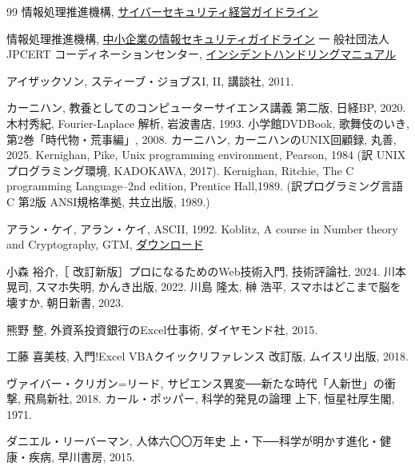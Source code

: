 \documentclass[book, paper=a4paper, 11pt]{jlreq}
\theoremstyle{definition}
\theoremstyle{remark}
\begin{document}
\begin{thebibliography}{99}
       情報処理推進機構, 
      \href{https://www.meti.go.jp/policy/netsecurity/downloadfiles/guide_v3.0.pdf}{サイバーセキュリティ経営ガイドライン}

       情報処理推進機構, 
     \href{https://www.ipa.go.jp/security/guide/sme/ug65p90000019cbk-att/sme_guideline_v4.0.pdf}{中小企業の情報セキュリティガイドライン}
       一 般社団法人 JPCERT コーディネーションセンター, 
       \href{https://www.jpcert.or.jp/csirt_material/files/manual_ver1.0_20211130.pdf}{インシデントハンドリングマニュアル}

      アイザックソン, スティーブ・ジョブスI, II, 講談社, 2011.

      カーニハン, 
      教養としてのコンピューターサイエンス講義 第二版, 日経BP, 2020.
      木村秀紀, Fourier-Laplace 解析, 岩波書店, 1993.
      小学館DVDBook, 歌舞伎のいき, 第2巻「時代物・荒事編」, 2008. 
      カーニハン,
      カーニハンのUNIX回顧録, 丸善, 2025.
      Kernighan, Pike, 
      Unix programming environment, Pearson, 1984
      (訳 UNIX プログラミング環境, KADOKAWA, 2017).
      Kernighan, Ritchie, 
      The C programming  Language--2nd edition, 
      Prentice Hall,1989. 
      (訳プログラミング言語C 第2版 ANSI規格準拠, 共立出版, 1989.)

      アラン・ケイ, アラン・ケイ, ASCII, 1992.
    Koblitz, A course in Number theory and Cryptography, GTM,  
   \href{https://link.springer.com/search?package=11649&facet-content-type=%22Book%22}{ダウンロード}

      小森 裕介,［ 改訂新版］プロになるためのWeb技術入門, 
      技術評論社, 2024.      
      川本 晃司, スマホ失明, かんき出版, 2022.
       川島 隆太, 榊 浩平, スマホはどこまで脳を壊すか, 朝日新書,  2023.
 
   熊野 整, 外資系投資銀行のExcel仕事術, ダイヤモンド社, 2015.
 
   工藤 喜美枝, 入門!Excel VBAクイックリファレンス 改訂版, ムイスリ出版, 2018.  
 
      ヴァイバー・クリガン=リード, 
      サピエンス異変──新たな時代「人新世」の衝撃, 
      飛鳥新社, 2018.
      カール・ポッパー, 科学的発見の論理 上下, 恒星社厚生閣, 1971.
   
   
      ダニエル・リーバーマン, 人体六〇〇万年史 
      上・下──科学が明かす進化・健康・疾病, 早川書房, 2015.
   

\end{thebibliography}
\end{document}
